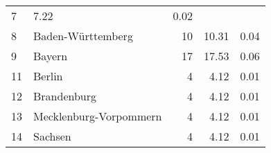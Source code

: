 \begin{longtable}{lXrrr}
       \num{7} &
       \num[round-mode=places,round-precision=2]{7.22} &
         \num[round-mode=places,round-precision=2]{0.02} \\

     8 &
     \multicolumn{1}{X}{ Baden-Württemberg   } &


       \num{10} &
       \num[round-mode=places,round-precision=2]{10.31} &
         \num[round-mode=places,round-precision=2]{0.04} \\

     9 &
     \multicolumn{1}{X}{ Bayern   } &


       \num{17} &
       \num[round-mode=places,round-precision=2]{17.53} &
         \num[round-mode=places,round-precision=2]{0.06} \\

     11 &
     \multicolumn{1}{X}{ Berlin   } &


       \num{4} &
       \num[round-mode=places,round-precision=2]{4.12} &
         \num[round-mode=places,round-precision=2]{0.01} \\

     12 &
     \multicolumn{1}{X}{ Brandenburg   } &


       \num{4} &
       \num[round-mode=places,round-precision=2]{4.12} &
         \num[round-mode=places,round-precision=2]{0.01} \\

     13 &
     \multicolumn{1}{X}{ Mecklenburg-Vorpommern   } &


       \num{4} &
       \num[round-mode=places,round-precision=2]{4.12} &
         \num[round-mode=places,round-precision=2]{0.01} \\

     14 &
     \multicolumn{1}{X}{ Sachsen   } &


       \num{4} &
       \num[round-mode=places,round-precision=2]{4.12} &
         \num[round-mode=places,round-precision=2]{0.01} \\


\end{longtable}

